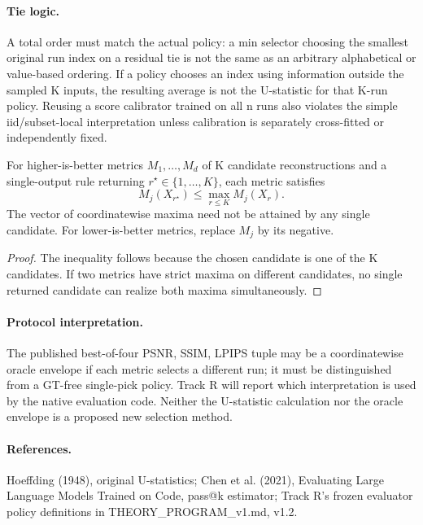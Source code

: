 \paragraph{Tie logic.}
A total order must match the actual policy: a min selector choosing
the smallest original run index on a residual tie is not the same
as an arbitrary alphabetical or value-based ordering. If a policy
chooses an index using information outside the sampled K inputs,
the resulting average is not the U-statistic for that K-run policy.
Reusing a score calibrator trained on all n runs also violates the
simple iid/subset-local interpretation unless calibration is
separately cross-fitted or independently fixed.

\begin{proposition}
\label{prop:th1-metric-inflation}
For higher-is-better metrics \(M_1,\ldots,M_d\) of K
candidate reconstructions and a single-output rule returning
\(r^\star\in\{1,\ldots,K\}\), each metric satisfies
\[
 M_j(X_{r^\star})\le\max_{r\le K}M_j(X_r).
\]
The vector of coordinatewise maxima need not be attained
by any single candidate. For lower-is-better metrics, replace
\(M_j\) by its negative.
\end{proposition}
\begin{proof}
The inequality follows because the chosen candidate is
one of the K candidates. If two metrics have strict maxima
on different candidates, no single returned candidate
can realize both maxima simultaneously.
\end{proof}

\paragraph{Protocol interpretation.}
The published best-of-four PSNR, SSIM, LPIPS tuple may be a
coordinatewise oracle envelope if each metric selects a different
run; it must be distinguished from a GT-free single-pick policy.
Track R will report which interpretation is used by the native
evaluation code. Neither the U-statistic calculation nor the
oracle envelope is a proposed new selection method.

\paragraph{References.}
Hoeffding (1948), original U-statistics;
Chen et al. (2021), Evaluating Large Language Models Trained
on Code, pass@k estimator; Track R's frozen evaluator policy
definitions in THEORY_PROGRAM_v1.md, v1.2.
